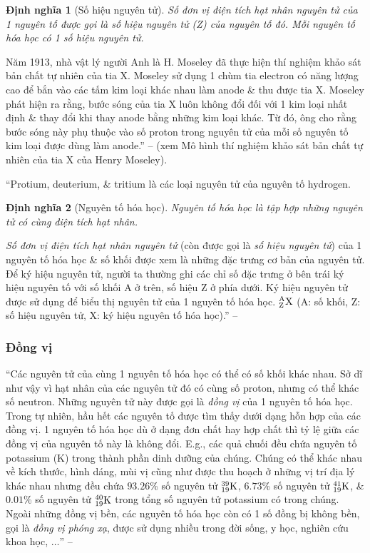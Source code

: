 \documentclass{article}
\numberwithin{equation}{section}
\newtheorem{dinhnghia}{Định nghĩa}[section]
\begin{document}
\begin{dinhnghia}[Số hiệu nguyên tử]
	Số đơn vị điện tích hạt nhân nguyên tử của 1 nguyên tố được gọi là \emph{số hiệu nguyên tử (Z)} của nguyên tố đó. Mỗi nguyên tố hóa học có 1 số hiệu nguyên tử.
\end{dinhnghia}
Năm 1913, nhà vật lý người Anh là H. Moseley đã thực hiện thí nghiệm khảo sát bản chất tự nhiên của tia X. Moseley sử dụng 1 chùm tia electron có năng lượng cao để bắn vào các tấm kim loại khác nhau làm anode \& thu được tia X. Moseley phát hiện ra rằng, bước sóng của tia X luôn không đổi đối với 1 kim loại nhất định \& thay đổi khi thay anode bằng những kim loại khác. Từ đó, ông cho rằng bước sóng này phụ thuộc vào số proton trong nguyên tử của mỗi số nguyên tố kim loại được dùng làm anode.'' -- \cite[p. 21]{SGK_Hoa_Hoc_10_Chan_Troi_Sang_Tao} (xem \textsf{Mô hình thí nghiệm khảo sát bản chất tự nhiên của tia X của Henry Moseley}).

``Protium, deuterium, \& tritium là các loại nguyên tử của nguyên tố hydrogen.

\begin{dinhnghia}[Nguyên tố hóa học]
	\emph{Nguyên tố hóa học} là tập hợp những nguyên tử có cùng điện tích hạt nhân.
\end{dinhnghia}
\textit{Số đơn vị điện tích hạt nhân nguyên tử} (còn được gọi là \textit{số hiệu nguyên tử}) của 1 nguyên tố hóa học \& số khối được xem là những đặc trưng cơ bản của nguyên tử. Để ký hiệu nguyên tử, người ta thường ghi các chỉ số đặc trưng ở bên trái ký hiệu nguyên tố với số khối A ở trên, số hiệu Z ở phía dưới. Ký hiệu nguyên tử được sử dụng để biểu thị nguyên tử của 1 nguyên tố hóa học. $\rm{}_Z^AX$ (A: số khối, Z: số hiệu nguyên tử, X: ký hiệu nguyên tố hóa học).'' -- \cite[p. 22]{SGK_Hoa_Hoc_10_Chan_Troi_Sang_Tao}

\subsubsection{Đồng vị}
``Các nguyên tử của cùng 1 nguyên tố hóa học có thể có số khối khác nhau. Sở dĩ như vậy vì hạt nhân của các nguyên tử đó có cùng số proton, nhưng có thể khác số neutron. Những nguyên tử này được gọi là \textit{đồng vị} của 1 nguyên tố hóa học. Trong tự nhiên, hầu hết các nguyên tố được tìm thấy dưới dạng hỗn hợp của các đồng vị. 1 nguyên tố hóa học dù ở dạng đơn chất hay hợp chất thì tỷ lệ giữa các đồng vị của nguyên tố này là không đổi. E.g., các quả chuối đều chứa nguyên tố potassium (K) trong thành phần dinh dưỡng của chúng. Chúng có thể khác nhau về kích thước, hình dáng, mùi vị cũng như được thu hoạch ở những vị trí địa lý khác nhau nhưng đều chứa $93.26$\% số nguyên tử $\rm{}_{19}^{39}K$, $6.73$\% số nguyên tử $\rm{}_{19}^{41}K$, \& $0.01$\% số nguyên tử $\rm{}_{19}^{40}K$ trong tổng số nguyên tử potassium có trong chúng. Ngoài những đồng vị bền, các nguyên tố hóa học còn có 1 số đồng bị không bền, gọi là \textit{đồng vị phóng xạ}, được sử dụng nhiều trong đời sống, y học, nghiên cứu khoa học, $\ldots$'' -- \cite[pp. 22--23]{SGK_Hoa_Hoc_10_Chan_Troi_Sang_Tao}
\end{document}
